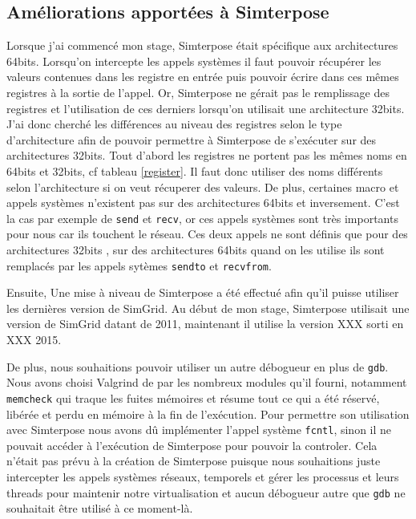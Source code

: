 \subsection{Améliorations apportées à Simterpose}

Lorsque j'ai commencé mon stage, Simterpose était spécifique aux architectures 64bits. Lorsqu'on intercepte les appels systèmes il faut pouvoir récupérer les valeurs contenues dans les registre en entrée puis pouvoir écrire dans ces mêmes registres à la sortie de l'appel. Or, Simterpose ne gérait pas le remplissage des registres et l'utilisation de ces derniers lorsqu'on utilisait une architecture 32bits. J'ai donc cherché les différences au niveau des registres selon le type d'architecture afin de pouvoir permettre à Simterpose de s'exécuter sur des architectures 32bits. Tout d'abord les registres ne portent pas les mêmes noms en 64bits et 32bits, cf tableau \ref{register}. Il faut donc utiliser des noms différents selon l'architecture si on veut récuperer des valeurs. De plus, certaines macro et appels systèmes n'existent pas sur des architectures 64bits et inversement. C'est la cas par exemple de \texttt{send} et \texttt{recv}, or ces appels systèmes sont très importants pour nous car ils touchent le réseau. Ces deux appels ne sont définis que pour des architectures 32bits , sur des architectures 64bits quand on les utilise ils sont remplacés par les appels sytèmes \texttt{sendto} et \texttt{recvfrom}.

Ensuite, Une mise à niveau de Simterpose a été effectué afin qu'il puisse utiliser les dernières version de SimGrid. Au début de mon stage, Simterpose utilisait une version de SimGrid datant de 2011, maintenant il utilise la version  {\color{red}XXX} sorti en {\color{red}XXX} 2015.

De plus, nous souhaitions pouvoir utiliser un autre {\color{red}débogueur} en plus de \texttt{gdb}. Nous avons choisi Valgrind de par les nombreux modules qu'il fourni, notamment \texttt{memcheck} qui traque les fuites mémoires et résume tout ce qui a été réservé, libérée et perdu en mémoire à la fin de l'exécution. Pour permettre son utilisation avec Simterpose nous avons dû implémenter l'appel système \texttt{fcntl}, sinon il ne pouvait accéder à l'exécution de Simterpose pour pouvoir la controler. Cela n'était pas prévu à la création de Simterpose puisque nous souhaitions juste intercepter les appels systèmes réseaux, temporels et gérer les processus et leurs threads pour maintenir notre virtualisation et aucun  {\color{red}débogueur} autre que \texttt{gdb} ne souhaitait être utilisé à ce moment-là.

